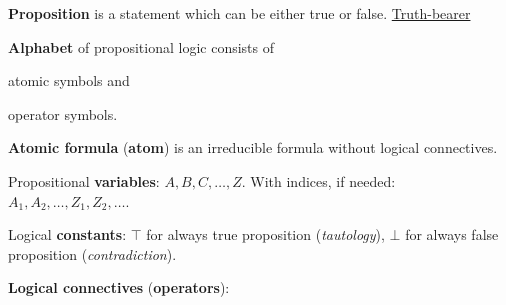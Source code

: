 \documentclass[a4paper,10pt]{article}
\begin{document}
\begin{terms}
    \item \textbf{Proposition} is a statement which can be either true or false.
    \hfill\href{https://en.wikipedia.org/wiki/Truth-bearer}{Truth-bearer}

    \item \textbf{Alphabet} of propositional logic consists of
    \begin{mylist}
        \item atomic symbols and
        \item operator symbols.
    \end{mylist}



    \item \textbf{Atomic formula} (\textbf{atom}) is an irreducible formula without logical connectives.
    \begin{terms}
        \item Propositional \textbf{variables}: $A, B, C, \dotsc, Z$. With indices, if needed: $A_1, A_2, \dotsc, Z_1, Z_2, \dotsc$.

        \item Logical \textbf{constants}: $\top$ for always true proposition (\textit{tautology}), $\bot$ for always false proposition (\textit{contradiction}).
    \end{terms}

    \item \textbf{Logical connectives} (\textbf{operators}):

    \begingroup
    \newcommand{\myA}{\mathcal{P}}
    \newcommand{\myB}{\mathcal{Q}}


\end{terms}
\end{document}
